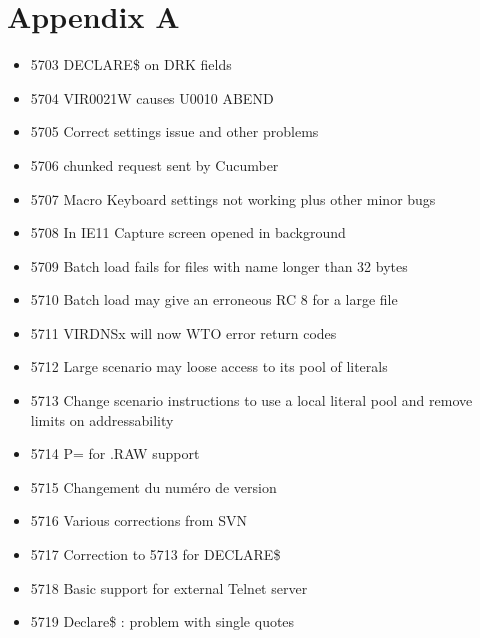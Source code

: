 \documentclass[letterpaper,10pt,english]{sphinxmanual}
\begin{document}
\chapter{Appendix A}
\label{\detokenize{TN201902:appendix-a}}
\begin{itemize}
\item {} 
5703 DECLARE\$ on DRK fields

\item {} 
5704 VIR0021W causes U0010 ABEND

\item {} 
5705 Correct settings issue and other problems

\item {} 
5706 chunked request sent by Cucumber

\item {} 
5707 Macro Keyboard settings not working plus other minor bugs

\item {} 
5708 In IE11 Capture screen opened in background

\item {} 
5709 Batch load fails for files with name longer than 32 bytes

\item {} 
5710 Batch load may give an erroneous RC 8 for a large file

\item {} 
5711 VIRDNSx will now WTO error return codes

\item {} 
5712 Large scenario may loose access to its pool of literals

\item {} 
5713 Change scenario instructions to use a local literal pool and remove limits on addressability

\item {} 
5714 P= for .RAW support

\item {} 
5715 Changement du numéro de version

\item {} 
5716 Various corrections from SVN

\item {} 
5717 Correction to 5713 for DECLARE\$

\item {} 
5718 Basic support for external Telnet server

\item {} 
5719 Declare\$ : problem with single quotes


\end{itemize}
\end{document}
